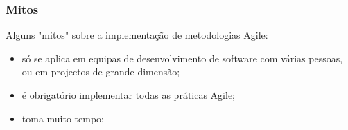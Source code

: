\documentclass[hyperref={pdfpagelabels=true}]{beamer}
\begin{document}
\begin{frame}
\frametitle{Mitos}

Alguns "mitos" sobre a implementa\c{c}\~{a}o de metodologias Agile: %
\begin{itemize}
  \item<2-> s\'{o} se aplica em equipas de desenvolvimento de software com v\'{a}rias pessoas, ou em projectos de grande dimens\~{a}o;%
  \item<3-> \'{e} obrigat\'{o}rio implementar todas as pr\'{a}ticas Agile;%
  \item<4-> toma muito tempo;%
\end{itemize}

\end{frame}

\end{document}
